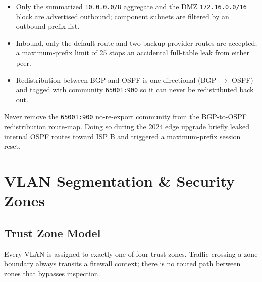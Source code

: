 \documentclass[11pt,a4paper]{report}
\begin{document}
\begin{itemize}[leftmargin=1.4em]
  \item Only the summarized \texttt{10.0.0.0/8} aggregate and the DMZ \texttt{172.16.0.0/16}
    block are advertised outbound; component subnets are filtered by an outbound prefix list.
  \item Inbound, only the default route and two backup provider routes are accepted; a
    maximum-prefix limit of 25 stops an accidental full-table leak from either peer.
  \item Redistribution between BGP and OSPF is one-directional (BGP $\rightarrow$ OSPF) and
    tagged with community \texttt{65001:900} so it can never be redistributed back out.
\end{itemize}

\begin{warnbox}
Never remove the \texttt{65001:900} no-re-export community from the BGP-to-OSPF redistribution
route-map. Doing so during the 2024 edge upgrade briefly leaked internal OSPF routes toward
ISP B and triggered a maximum-prefix session reset.
\end{warnbox}

\chapter{VLAN Segmentation \& Security Zones}

\section{Trust Zone Model}
Every VLAN is assigned to exactly one of four trust zones. Traffic crossing a zone boundary
always transits a firewall context; there is no routed path between zones that bypasses
inspection.
\end{document}
